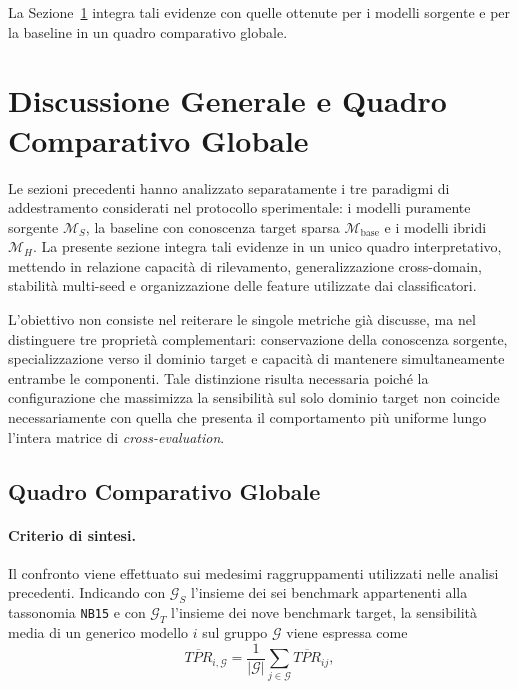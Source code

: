 La Sezione~\ref{sec:discussione_generale} integra tali evidenze con quelle ottenute per i modelli sorgente e per la baseline in un quadro comparativo globale.




\section{Discussione Generale e Quadro Comparativo Globale}
\label{sec:discussione_generale}

Le sezioni precedenti hanno analizzato separatamente i tre paradigmi di addestramento considerati nel protocollo sperimentale: i modelli puramente sorgente $\mathcal{M}_{S}$, la baseline con conoscenza target sparsa $\mathcal{M}_{\mathrm{base}}$ e i modelli ibridi $\mathcal{M}_{H}$.
La presente sezione integra tali evidenze in un unico quadro interpretativo, mettendo in relazione capacità di rilevamento, generalizzazione cross-domain, stabilità multi-seed e organizzazione delle feature utilizzate dai classificatori.

L'obiettivo non consiste nel reiterare le singole metriche già discusse, ma nel distinguere tre proprietà complementari: conservazione della conoscenza sorgente, specializzazione verso il dominio target e capacità di mantenere simultaneamente entrambe le componenti. 
Tale distinzione risulta necessaria poiché la configurazione che massimizza la sensibilità sul solo dominio target non coincide necessariamente con quella che presenta il comportamento più uniforme lungo l'intera matrice di \textit{cross-evaluation}.



\subsection{Quadro Comparativo Globale}
\label{subsec:quadro_comparativo_globale}

\paragraph{Criterio di sintesi.}
Il confronto viene effettuato sui medesimi raggruppamenti utilizzati nelle analisi precedenti. 
Indicando con $\mathcal{G}_{S}$ l'insieme dei sei benchmark appartenenti alla tassonomia \texttt{NB15} e con $\mathcal{G}_{T}$ l'insieme dei nove benchmark target, la sensibilità media di un generico modello $i$ sul gruppo $\mathcal{G}$ viene espressa come
\begin{equation}
    \overline{TPR}_{i,\mathcal{G}}
    =
    \frac{1}{|\mathcal{G}|}
    \sum_{j\in\mathcal{G}}
    \overline{TPR}_{ij},
    \label{eq:cap5_global_group_tpr}
\end{equation}

